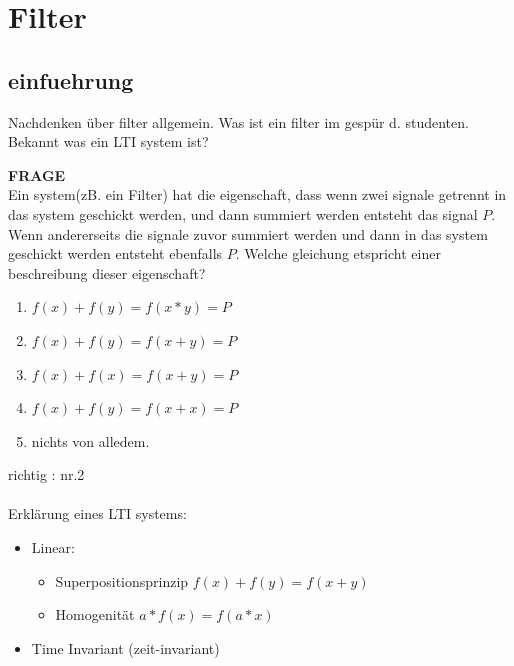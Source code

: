 \chapter{Filter}
\label{Filter}


\section{einfuehrung} %
\label{sub:einfuehrung}




Nachdenken über filter allgemein. Was ist ein filter im gespür d. studenten. \\
Bekannt was ein LTI system ist?\\

\newpage

\textbf{FRAGE}\\
Ein system(zB. ein Filter) hat die eigenschaft, dass wenn zwei signale getrennt in das system geschickt werden, und dann summiert werden entsteht das signal \(P\). Wenn andererseits die signale zuvor summiert werden und dann in das system geschickt werden entsteht ebenfalls \(P\). Welche gleichung etspricht einer beschreibung dieser eigenschaft?

\begin{enumerate}
	\item \(f(x)+f(y) = f (x * y) = P\)
	\item \(f(x)+f(y) = f (x + y) = P\)
	\item \(f(x)+f(x) = f (x + y) = P\)
	\item \(f(x)+f(y) = f (x + x) = P\)
	\item nichts von alledem.
\end{enumerate}

\newpage
richtig : nr.2 \\
\\

Erklärung eines LTI systems:

\begin{itemize}
	\item Linear:
		\begin{itemize}
			\item Superpositionsprinzip \(f(x)+f(y) = f (x + y)\)
			\item Homogenität \(a*f(x) = f(a*x)\) 
		\end{itemize}
	\item Time Invariant (zeit-invariant)
\end{itemize}



